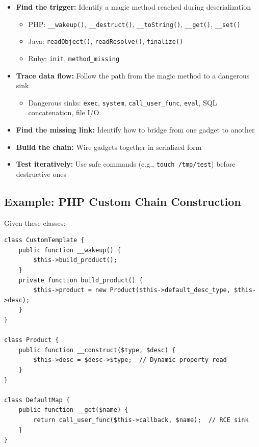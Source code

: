 \documentclass[11pt]{article}
\begin{document}
\begin{checklistbox}
\begin{itemize}
    \item[\checkmark] \textbf{Find the trigger:} Identify a magic method reached during deserialization
    \begin{itemize}
        \item PHP: \texttt{\_\_wakeup()}, \texttt{\_\_destruct()}, \texttt{\_\_toString()}, \texttt{\_\_get()}, \texttt{\_\_set()}
        \item Java: \texttt{readObject()}, \texttt{readResolve()}, \texttt{finalize()}
        \item Ruby: \texttt{init}, \texttt{method\_missing}
    \end{itemize}
    \item[\checkmark] \textbf{Trace data flow:} Follow the path from the magic method to a dangerous sink
    \begin{itemize}
        \item Dangerous sinks: \texttt{exec}, \texttt{system}, \texttt{call\_user\_func}, \texttt{eval}, SQL concatenation, file I/O
    \end{itemize}
    \item[\checkmark] \textbf{Find the missing link:} Identify how to bridge from one gadget to another
    \item[\checkmark] \textbf{Build the chain:} Wire gadgets together in serialized form
    \item[\checkmark] \textbf{Test iteratively:} Use safe commands (e.g., \texttt{touch /tmp/test}) before destructive ones
\end{itemize}
\end{checklistbox}

\subsection{Example: PHP Custom Chain Construction}

Given these classes:
\begin{lstlisting}[style=code]
class CustomTemplate {
    public function __wakeup() {
        $this->build_product();
    }
    private function build_product() {
        $this->product = new Product($this->default_desc_type, $this->desc);
    }
}

class Product {
    public function __construct($type, $desc) {
        $this->desc = $desc->$type;  // Dynamic property read
    }
}

class DefaultMap {
    public function __get($name) {
        return call_user_func($this->callback, $name);  // RCE sink
    }
}
\end{lstlisting}
\end{document}
